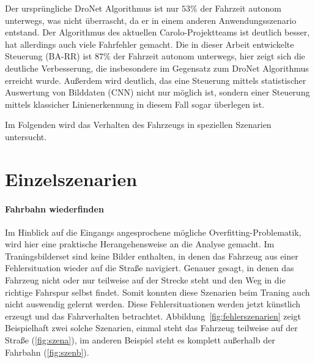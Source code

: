 Der ursprüngliche DroNet Algorithmus ist nur $53 \%$ der Fahrzeit autonom unterwegs, was nicht überrascht, da er in einem anderen Anwendungsszenario entstand. Der Algorithmus des aktuellen Carolo-Projektteams ist deutlich besser, hat allerdings auch viele Fahrfehler gemacht. Die in dieser Arbeit entwickelte Steuerung (BA-RR) ist $87 \%$ der Fahrzeit autonom unterwegs, hier zeigt sich die deutliche Verbesserung, die insbesondere im Gegensatz zum DroNet Algorithmus erreicht wurde. Außerdem wird deutlich, das eine Steuerung mittels statistischer Auswertung von Bilddaten (CNN) nicht nur möglich ist, sondern einer Steuerung mittels klassicher Linienerkennung in diesem Fall sogar überlegen ist. 

Im Folgenden wird das Verhalten des Fahrzeugs in speziellen Szenarien untersucht.

\section{Einzelszenarien}

\paragraph{Fahrbahn wiederfinden}
Im Hinblick auf die Eingangs angesprochene mögliche Overfitting-Problematik, wird hier eine praktische Herangehensweise an die Analyse gemacht.
Im Traningsbilderset sind keine Bilder enthalten, in denen das Fahrzeug aus einer Fehlersituation wieder auf die Straße navigiert. Genauer gesagt, in denen das Fahrzeug nicht oder nur teilweise auf der Strecke steht und den Weg in die richtige Fahrspur selbst findet. Somit konnten diese Szenarien beim Traning auch nicht \glqq auswendig \grqq{} gelernt werden. Diese Fehlersituationen werden jetzt künstlich erzeugt und das Fahrverhalten betrachtet.
Abbildung~\ref{fig:fehlerszenarien} zeigt Beispielhaft zwei solche Szenarien, einmal steht das Fahrzeug teilweise auf der Straße (\ref{fig:szena}), im anderen Beispiel steht es komplett außerhalb der Fahrbahn (\ref{fig:szenb}).


